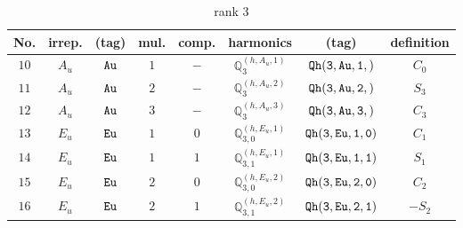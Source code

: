 \documentclass[fleqn,8pt]{jsarticle}
\begin{document}
\begin{table}[ht!]
\begin{center}
\caption{rank 3}
\renewcommand{\arraystretch}{1.3}
\begin{tabular}{cccccccc} \hline \hline
No. & irrep. & (tag) & mul. & comp. & harmonics & (tag) & definition \\ \hline
$ 10 $ & $ A_{u} $ & $ {\tt Au} $ & $ 1 $ & $ - $ & $ \mathbb{Q}_{3}^{(h,A_{u},1)} $ & $ {\tt Qh(3,Au,1,)} $ & $ C_{0} $ \\
$ 11 $ & $ A_{u} $ & $ {\tt Au} $ & $ 2 $ & $ - $ & $ \mathbb{Q}_{3}^{(h,A_{u},2)} $ & $ {\tt Qh(3,Au,2,)} $ & $ S_{3} $ \\
$ 12 $ & $ A_{u} $ & $ {\tt Au} $ & $ 3 $ & $ - $ & $ \mathbb{Q}_{3}^{(h,A_{u},3)} $ & $ {\tt Qh(3,Au,3,)} $ & $ C_{3} $ \\
$ 13 $ & $ E_{u} $ & $ {\tt Eu} $ & $ 1 $ & $ 0 $ & $ \mathbb{Q}_{3,0}^{(h,E_{u},1)} $ & $ {\tt Qh(3,Eu,1,0)} $ & $ C_{1} $ \\
$ 14 $ & $ E_{u} $ & $ {\tt Eu} $ & $ 1 $ & $ 1 $ & $ \mathbb{Q}_{3,1}^{(h,E_{u},1)} $ & $ {\tt Qh(3,Eu,1,1)} $ & $ S_{1} $ \\
$ 15 $ & $ E_{u} $ & $ {\tt Eu} $ & $ 2 $ & $ 0 $ & $ \mathbb{Q}_{3,0}^{(h,E_{u},2)} $ & $ {\tt Qh(3,Eu,2,0)} $ & $ C_{2} $ \\
$ 16 $ & $ E_{u} $ & $ {\tt Eu} $ & $ 2 $ & $ 1 $ & $ \mathbb{Q}_{3,1}^{(h,E_{u},2)} $ & $ {\tt Qh(3,Eu,2,1)} $ & $ - S_{2} $ \\
 \hline \hline
\end{tabular}
\end{center}
\end{table}
\end{document}
